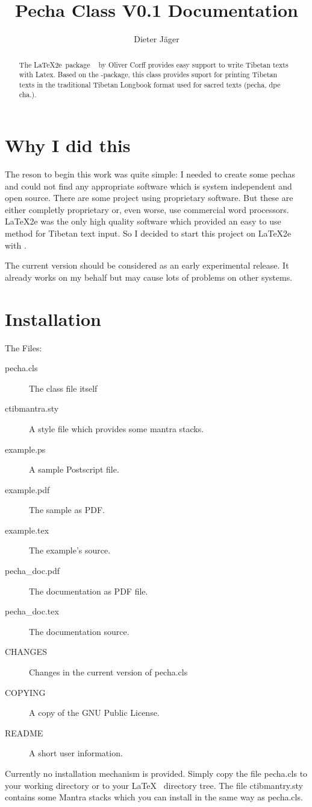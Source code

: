 \documentclass[a4paper,11pt]{article}
\title{Pecha Class V0.1 Documentation}
\author{Dieter Jäger}
\begin{document}
\maketitle

\begin{abstract}
The \LaTeX2e~package \TibTeX~ by Oliver Corff provides easy support to write Tibetan texts with Latex. 
Based on the {\TibTeX}-package, this class provides suport for printing Tibetan texts in the traditional Tibetan Longbook format used for sacred texts (pecha, {\tiny \tib dpe cha.}).
\end{abstract}

\section{Why I did this}
The reson to begin this work was quite simple: I needed to create some pechas and could not find any appropriate software which is system independent and open source. There are some project using proprietary software. But these are either completly proprietary or, even worse, use commercial word processors. \LaTeX2e was the only high quality software which provided an easy to use method for Tibetan text input. So I decided to start this project on \LaTeX2e with \TibTeX. 

The current version should be considered as an early experimental release. It already works on my behalf but may cause lots of problems on other systems.

\section{Installation}
The Files:
\begin{description}
\item[pecha.cls] The class file itself
\item[ctibmantra.sty] A style file which provides some mantra stacks.
\item[example.ps] A sample Postscript file.
\item[example.pdf] The sample as PDF.
\item[example.tex] The example's source.
\item[pecha\_doc.pdf] The documentation as PDF file.
\item[pecha\_doc.tex] The documentation source.
\item[CHANGES] Changes in the current version of pecha.cls
\item[COPYING] A copy of the GNU Public License.
\item[README] A short user information.
\end{description}
Currently no installation mechanism is provided. Simply copy the file pecha.cls to your working directory or to your \LaTeX~ directory tree. The file ctibmantry.sty contains some Mantra stacks which you can install in the same way as pecha.cls.
\end{document}
